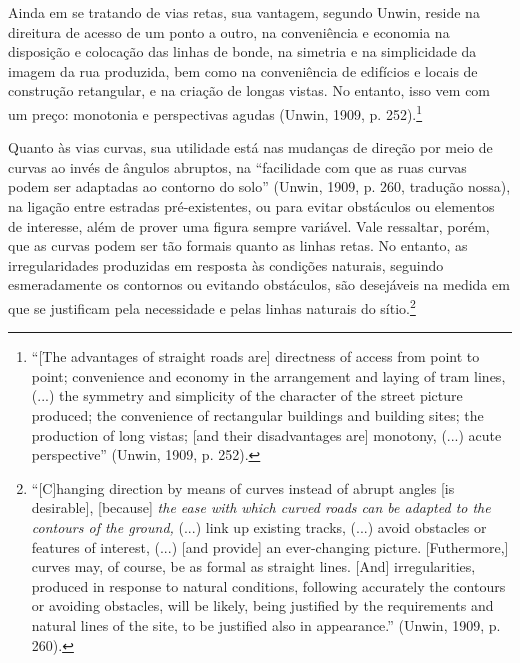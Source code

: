 \documentclass[12pt, a4paper]{book} %
\begin{document}
        Ainda em se tratando de vias retas, sua vantagem, segundo Unwin, reside na direitura de acesso de um ponto a outro, na conveniência e economia na disposição e colocação das linhas de bonde, na simetria e na simplicidade da imagem da rua produzida, bem como na conveniência de edifícios e locais de construção retangular, e na criação de longas vistas. No entanto, isso vem com um preço: monotonia e perspectivas agudas (Unwin, 1909, p. 252).\footnote[80]{``[The advantages of straight roads are] directness of access from point to point; convenience and economy in the arrangement and laying of tram lines, (...) the symmetry and simplicity of the character of the street picture produced; the convenience of rectangular buildings and building sites; the production of long vistas; [and their disadvantages are] monotony, (...) acute perspective'' (Unwin, 1909, p. 252).}
        
        Quanto às vias curvas, sua utilidade está nas mudanças de direção por meio de curvas ao invés de ângulos abruptos, na ``facilidade com que as ruas curvas podem ser adaptadas ao contorno do solo'' (Unwin, 1909, p. 260, tradução nossa), na ligação entre estradas pré-existentes, ou para evitar obstáculos ou elementos de interesse, além de prover uma figura sempre variável. Vale ressaltar, porém, que as curvas podem ser tão formais quanto as linhas retas. No entanto, as irregularidades produzidas em resposta às condições naturais, seguindo esmeradamente os contornos ou evitando obstáculos, são desejáveis na medida em que se justificam pela necessidade e pelas linhas naturais do sítio.\footnote[81]{``[C]hanging direction by means of curves instead of abrupt angles [is desirable], [because] \textit{the ease with which curved roads can be adapted to the contours of the ground,} (...) link up existing tracks, (...) avoid obstacles or features of interest, (...) [and provide] an ever-changing picture. [Futhermore,] curves may, of course, be as formal as straight lines. [And] irregularities, produced in response to natural conditions, following accurately the contours or avoiding obstacles, will be likely, being justified by the requirements and natural lines of the site, to be justified also in appearance.'' (Unwin, 1909, p. 260).}
\end{document}
